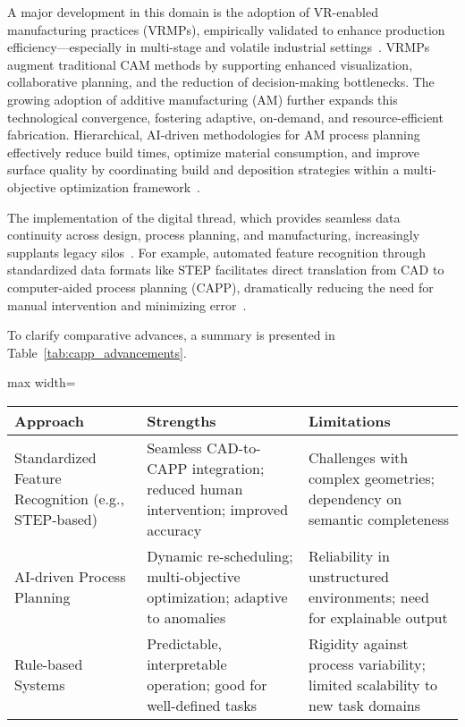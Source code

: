 \documentclass[sigconf]{acmart}
\begin{document}
A major development in this domain is the adoption of VR-enabled manufacturing practices (VRMPs), empirically validated to enhance production efficiency—especially in multi-stage and volatile industrial settings~\cite{ref83}. VRMPs augment traditional CAM methods by supporting enhanced visualization, collaborative planning, and the reduction of decision-making bottlenecks. The growing adoption of additive manufacturing (AM) further expands this technological convergence, fostering adaptive, on-demand, and resource-efficient fabrication. Hierarchical, AI-driven methodologies for AM process planning effectively reduce build times, optimize material consumption, and improve surface quality by coordinating build and deposition strategies within a multi-objective optimization framework~\cite{ref2,ref5,ref6,ref7,ref15,ref20,ref27,ref44,ref47,ref48,ref52,ref58,ref59,ref69,ref84}.

The implementation of the digital thread, which provides seamless data continuity across design, process planning, and manufacturing, increasingly supplants legacy silos~\cite{ref11,ref51}. For example, automated feature recognition through standardized data formats like STEP facilitates direct translation from CAD to computer-aided process planning (CAPP), dramatically reducing the need for manual intervention and minimizing error~\cite{ref51}.

To clarify comparative advances, a summary is presented in Table~\ref{tab:capp_advancements}.

\begin{table*}[htbp]
\centering
\caption{Comparative Advances in Automated Process Planning}
\label{tab:capp_advancements}
\begin{adjustbox}{max width=\textwidth}
\begin{tabular}{lll}
\toprule
\textbf{Approach} & \textbf{Strengths} & \textbf{Limitations} \\
\midrule
Standardized Feature Recognition (e.g., STEP-based) & Seamless CAD-to-CAPP integration; reduced human intervention; improved accuracy & Challenges with complex geometries; dependency on semantic completeness \\
AI-driven Process Planning & Dynamic re-scheduling; multi-objective optimization; adaptive to anomalies & Reliability in unstructured environments; need for explainable output \\
Rule-based Systems & Predictable, interpretable operation; good for well-defined tasks & Rigidity against process variability; limited scalability to new task domains \\
\bottomrule
\end{tabular}
\end{adjustbox}
\end{table*}
\end{document}

